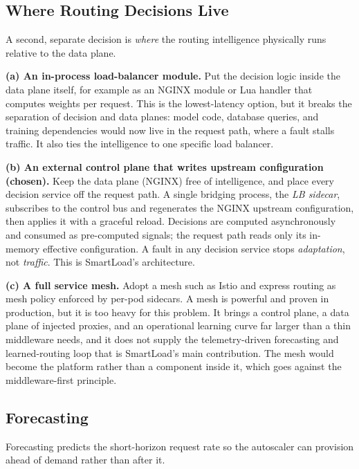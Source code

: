 \subsection{Where Routing Decisions Live}
\label{dsb:alt-locus}

A second, separate decision is \emph{where} the routing intelligence physically
runs relative to the data plane.

\textbf{(a) An in-process load-balancer module.} Put the decision logic inside
the data plane itself, for example as an NGINX \cite{nginx} module or Lua
handler that computes weights per request. This is the lowest-latency option,
but it breaks the separation of decision and data planes: model code, database
queries, and training dependencies would now live in the request path, where a
fault stalls traffic. It also ties the intelligence to one specific load
balancer.

\textbf{(b) An external control plane that writes upstream configuration
(chosen).} Keep the data plane (NGINX) free of intelligence, and place every
decision service off the request path. A single bridging process, the
\emph{LB sidecar}, subscribes to the control bus and regenerates the NGINX
upstream configuration, then applies it with a graceful reload. Decisions are
computed asynchronously and consumed as pre-computed signals; the request path
reads only its in-memory effective configuration. A fault in any decision
service stops \emph{adaptation}, not \emph{traffic}. This is SmartLoad's
architecture.

\textbf{(c) A full service mesh.} Adopt a mesh such as Istio \cite{istio} and
express routing as mesh policy enforced by per-pod sidecars. A mesh is powerful
and proven in production, but it is too heavy for this problem. It brings a
control plane, a data plane of injected proxies, and an operational learning
curve far larger than a thin middleware needs, and it does not supply the
telemetry-driven forecasting and learned-routing loop that is SmartLoad's main
contribution. The mesh would become the platform rather than a component inside
it, which goes against the middleware-first principle.

\subsection{Forecasting}
\label{dsb:alt-forecast}

Forecasting predicts the short-horizon request rate so the autoscaler can
provision ahead of demand rather than after it.

